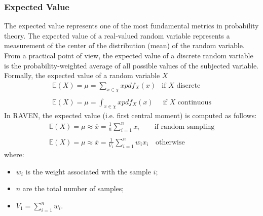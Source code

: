 \subsubsection{Expected Value}
The expected value represents one of the most fundamental metrics in probability theory. The expected value of a 
real-valued random variable represents a measurement of the center of the distribution (mean) of the random variable. 
From a practical point of view, the expected value of a discrete random variable is the probability-weighted average of all possible values of the subjected variable. Formally, the expected value of a random variable $X$
\begin{equation}
\begin{matrix}
\mathbb{E}(X) = \mu = \sum_{x \in \chi} x  pdf_{X}(x) & \text{if  $X$  discrete} \\ 
\\ 
\mathbb{E}(X) = \mu = \int_{x \in \chi} x pdf_{X}(x) & \, \text{if $X$ continuous}
\end{matrix}
\end{equation}
In RAVEN, the expected value (i.e. first central moment) is computed as follows:
\begin{equation}
\begin{matrix}
\mathbb{E}(X) = \mu \approx \overline{x} = \frac{1}{n} \sum_{i=1}^{n}  x_{i} & \text{if  random sampling} \\ 
\\ 
\mathbb{E}(X) = \mu \approx \overline{x} = \frac{1}{V_{1}} \sum_{i=1}^{n} w_{i}  x_{i}  & \, \text{otherwise}
\end{matrix}
\end{equation}
where:
\begin{itemize}
  \item $w_{i}$ is the weight associated with the sample $i$;
  \item $n$ are the total number of samples;
  \item $V_{1} = \sum_{i=1}^{n} w_{i}$.
\end{itemize}
